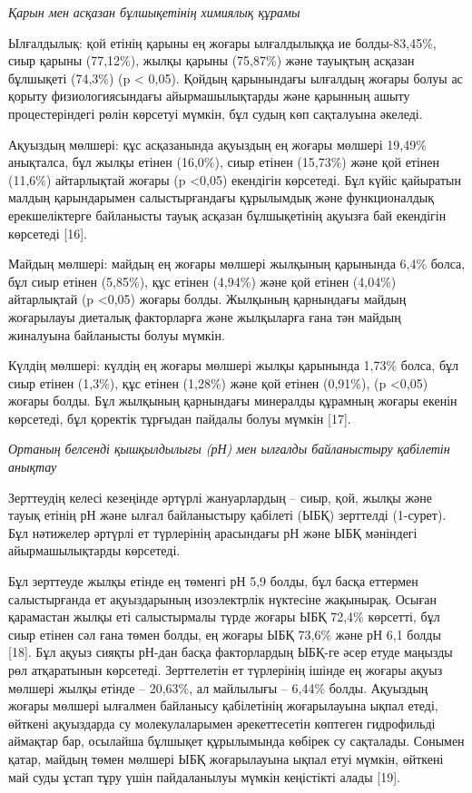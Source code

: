 \begin{multicols}{2}
\emph{Қарын мен асқазан бұлшықетінің химиялық құрамы}

Ылғалдылық: қой етінің қарыны ең жоғары ылғалдылыққа ие болды-83,45\%,
сиыр қарыны (77,12\%), жылқы қарыны (75,87\%) және тауықтың асқазан
бұлшықеті (74,3\%) (p \textless{} 0,05). Қойдың қарынындағы ылғалдың
жоғары болуы ас қорыту физиологиясындағы айырмашылықтарды және қарынның
ашыту процестеріндегі рөлін көрсетуі мүмкін, бұл судың көп сақталуына
әкеледі.

Ақуыздың мөлшері: құс асқазанында ақуыздың ең жоғары мөлшері 19,49\%
анықталса, бұл жылқы етінен (16,0\%), сиыр етінен (15,73\%) және қой
етінен (11,6\%) айтарлықтай жоғары (p \textless0,05) екендігін
көрсетеді. Бұл күйіс қайыратын малдың қарындарымен салыстырғандағы
құрылымдық және функционалдық ерекшеліктерге байланысты тауық асқазан
бұлшықетінің ақуызға бай екендігін көрсетеді {[}16{]}.

Майдың мөлшері: майдың ең жоғары мөлшері жылқының қарынында 6,4\% болса,
бұл сиыр етінен (5,85\%), құс етінен (4,94\%) және қой етінен (4,04\%)
айтарлықтай (p \textless0,05) жоғары болды. Жылқының қарнындағы майдың
жоғарылауы диеталық факторларға және жылқыларға ғана тән майдың
жиналуына байланысты болуы мүмкін.

Күлдің мөлшері: күлдің ең жоғары мөлшері жылқы қарынында 1,73\% болса,
бұл сиыр етінен (1,3\%), құс етінен (1,28\%) және қой етінен (0,91\%),
(p \textless0,05) жоғары болды. Бұл жылқының қарнындағы минералды
құрамның жоғары екенін көрсетеді, бұл қоректік тұрғыдан пайдалы болуы
мүмкін {[}17{]}.

\emph{Ортаның белсенді қышқылдылығы (рН) мен ылғалды байланыстыру
қабілетін анықтау}

Зерттеудің келесі кезеңінде әртүрлі жануарлардың -- сиыр, қой, жылқы
және тауық етінің рН және ылғал байланыстыру қабілеті (ЫБҚ) зерттелді
(1-сурет). Бұл нәтижелер әртүрлі ет түрлерінің арасындағы рН және ЫБҚ
мәніндегі айырмашылықтарды көрсетеді.

Бұл зерттеуде жылқы етінде ең төменгі рН 5,9 болды, бұл басқа еттермен
салыстырғанда ет ақуыздарының изоэлектрлік нүктесіне жақынырақ. Осыған
қарамастан жылқы еті салыстырмалы түрде жоғары ЫБҚ 72,4\% көрсетті, бұл
сиыр етінен сәл ғана төмен болды, ең жоғары ЫБҚ 73,6\% және рН 6,1 болды
{[}18{]}. Бұл ақуыз сияқты рН-дан басқа факторлардың ЫБҚ-ге әсер етуде
маңызды рөл атқаратынын көрсетеді. Зерттелетін ет түрлерінің ішінде ең
жоғары ақуыз мөлшері жылқы етінде -- 20,63\%, ал майлылығы -- 6,44\%
болды. Ақуыздың жоғары мөлшері ылғалмен байланысу қабілетінің
жоғарылауына ықпал етеді, өйткені ақуыздарда су молекулаларымен
әрекеттесетін көптеген гидрофильді аймақтар бар, осылайша бұлшықет
құрылымында көбірек су сақталады. Сонымен қатар, майдың төмен мөлшері
ЫБҚ жоғарылауына ықпал етуі мүмкін, өйткені май суды ұстап тұру үшін
пайдаланылуы мүмкін кеңістікті алады {[}19{]}.
\end{multicols}

